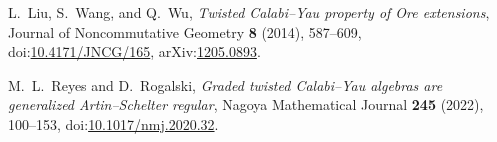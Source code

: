 L.~Liu, S.~Wang, and Q.~Wu,
\emph{Twisted Calabi--Yau property of Ore extensions},
Journal of Noncommutative Geometry \textbf{8} (2014), 587--609,
doi:\href{https://doi.org/10.4171/JNCG/165}{10.4171/JNCG/165},
arXiv:\href{https://arxiv.org/abs/1205.0893}{1205.0893}.

M.~L.~Reyes and D.~Rogalski,
\emph{Graded twisted Calabi--Yau algebras are generalized Artin--Schelter regular},
Nagoya Mathematical Journal \textbf{245} (2022), 100--153,
doi:\href{https://doi.org/10.1017/nmj.2020.32}{10.1017/nmj.2020.32}.
